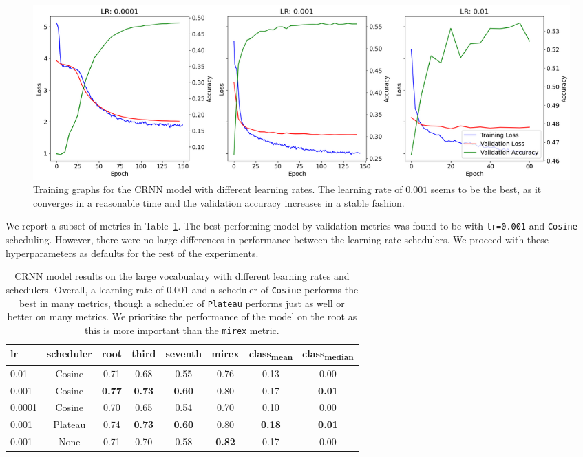 \begin{figure}[h]
    \centering
    \includegraphics[width=1.0\textwidth]{figures/lr_search_cosine.png}
    \caption{Training graphs for the CRNN model with different learning rates. The learning rate of $0.001$ seems to be the best, as it converges in a reasonable time and the validation accuracy increases in a stable fashion.}\label{fig:lr_search_cosine}
\end{figure}

We report a subset of metrics in Table~\ref{tab:crnn_lr}. The best performing model by validation metrics was found to be with \texttt{lr=0.001} and \texttt{Cosine} scheduling. However, there were no large differences in performance between the learning rate schedulers. We proceed with these hyperparameters as defaults for the rest of the experiments.

\begin{table}[h]
    \centering
    \begin{tabular}{lccccccc}
        \toprule
        lr & scheduler & root & third & seventh & mirex & class\textsubscript{mean} & class\textsubscript{median} \\
        \midrule
        0.01 & Cosine & 0.71 & 0.68 & 0.55 & 0.76 & 0.13 & 0.00 \\
        0.001 & Cosine & \textbf{0.77} & \textbf{0.73} & \textbf{0.60} & 0.80 & 0.17 & \textbf{0.01} \\
        0.0001 & Cosine & 0.70 & 0.65 & 0.54 & 0.70 & 0.10 & 0.00 \\
        \midrule
        0.001 & Plateau & 0.74 & \textbf{0.73} & \textbf{0.60} & 0.80 & \textbf{0.18} & \textbf{0.01} \\
        0.001 & None & 0.71 & 0.70 & 0.58 & \textbf{0.82} & 0.17 & 0.00 \\
        \bottomrule
    \end{tabular}
    \caption{CRNN model results on the large vocabualary with different learning rates and schedulers. Overall, a learning rate of 0.001 and a scheduler of \texttt{Cosine} performs the best in many metrics, though a scheduler of \texttt{Plateau} performs just as well or better on many metrics. We prioritise the performance of the model on the root as this is more important than the \texttt{mirex} metric. }\label{tab:crnn_lr}
\end{table}


